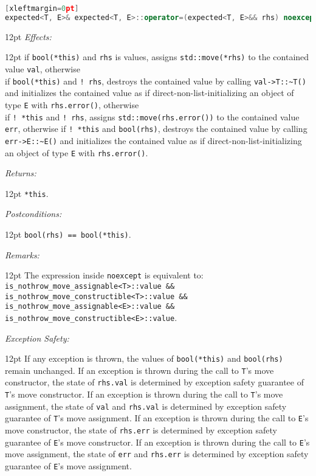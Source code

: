 \documentclass[a4paper,10pt]{article}
\newcommand{\cpp}[1]{\lstinline{#1}}
\newcommand{\wordingItem}[1]{\noindent\textit{#1:}}
\newenvironment{wordingTextItem}[1]{\wordingItem{#1}\vspace{2pt}\noindent\begin{adjustwidth}{12pt}{}}{\vspace{2pt}\end{adjustwidth}}
\newenvironment{wordingPara}{\begin{adjustwidth}{12pt}{}}{\end{adjustwidth}}
\begin{document}
\begin{lstlisting}[language=C++][xleftmargin=0pt]
expected<T, E>& expected<T, E>::operator=(expected<T, E>&& rhs) noexcept(/*see below*/); 
\end{lstlisting}
\begin{wordingPara}
\begin{wordingTextItem}{Effects}
if \cpp{bool(*this)} and \cpp{rhs} is values, assigns \cpp{std::move(*rhs)} to the contained value \cpp{val}, otherwise \\
if \cpp{bool(*this)} and \cpp{! rhs}, destroys the contained value by calling \cpp{val->T::~T()} and  initializes the contained value as if direct-non-list-initializing an object of type \cpp{E} with \cpp{rhs.error()}, otherwise \\
if \cpp{! *this} and \cpp{! rhs}, assigns \cpp{std::move(rhs.error())} to the contained value \cpp{err}, otherwise  
if \cpp{! *this} and \cpp{bool(rhs)}, destroys the contained value by calling \cpp{err->E::~E()} and  initializes the contained value as if direct-non-list-initializing an object of type \cpp{E} with \cpp{rhs.error()}.
\end{wordingTextItem}
\begin{wordingTextItem}{Returns}
\cpp{*this}.
\end{wordingTextItem}
\begin{wordingTextItem}{Postconditions}
\cpp{bool(rhs) == bool(*this)}.
\end{wordingTextItem}
\begin{wordingTextItem}{Remarks}
The expression inside \cpp{noexcept} is equivalent to:\\
\cpp{is_nothrow_move_assignable<T>::value &&}\\
\cpp{is_nothrow_move_constructible<T>::value &&}\\
\cpp{is_nothrow_move_assignable<E>::value &&}\\
\cpp{is_nothrow_move_constructible<E>::value}.
\end{wordingTextItem}
\begin{wordingTextItem}{Exception Safety}
If any exception is thrown, the values of  \cpp{bool(*this)} and \cpp{bool(rhs)} remain unchanged. If an exception is thrown during the call to \cpp{T}'s move constructor, the state of \cpp{rhs.val} is determined by exception safety guarantee of \cpp{T}'s move constructor. If an exception is thrown during the call to \cpp{T}'s move assignment, the state of \cpp{val} and \cpp{rhs.val} is determined by exception safety guarantee of \cpp{T}'s move assignment. If an exception is thrown during the call to \cpp{E}'s move constructor, the state of \cpp{rhs.err} is determined by exception safety guarantee of \cpp{E}'s move constructor. If an exception is thrown during the call to \cpp{E}'s move assignment, the state of \cpp{err} and \cpp{rhs.err} is determined by exception safety guarantee of \cpp{E}'s move assignment.

\end{wordingTextItem}
\end{wordingPara}
\end{document}
